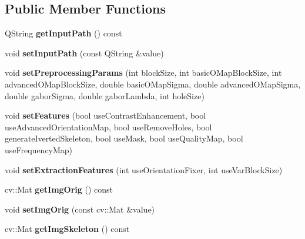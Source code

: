 \subsection*{Public Member Functions}
\begin{DoxyCompactItemize}
\item 
\mbox{\label{class_extraction_tester_a08e0e44aa7b635877e8254fef2a9f7d4}} 
Q\+String {\bfseries get\+Input\+Path} () const
\item 
\mbox{\label{class_extraction_tester_ab1d54e456d20bc1d921cfa6e0491c06c}} 
void {\bfseries set\+Input\+Path} (const Q\+String \&value)
\item 
\mbox{\label{class_extraction_tester_a19d6aa346489851a1b0812518f98de44}} 
void {\bfseries set\+Preprocessing\+Params} (int block\+Size, int basic\+O\+Map\+Block\+Size, int advanced\+O\+Map\+Block\+Size, double basic\+O\+Map\+Sigma, double advanced\+O\+Map\+Sigma, double gabor\+Sigma, double gabor\+Lambda, int hole\+Size)
\item 
\mbox{\label{class_extraction_tester_a0bd042b9f638d158c8c6de3d7f24ee10}} 
void {\bfseries set\+Features} (bool use\+Contrast\+Enhancement, bool use\+Advanced\+Orientation\+Map, bool use\+Remove\+Holes, bool generate\+Iverted\+Skeleton, bool use\+Mask, bool use\+Quality\+Map, bool use\+Frequency\+Map)
\item 
\mbox{\label{class_extraction_tester_a5cfce171a89497befe38148cf7a10792}} 
void {\bfseries set\+Extraction\+Features} (int use\+Orientation\+Fixer, int use\+Var\+Block\+Size)
\item 
\mbox{\label{class_extraction_tester_a88092baa79b5fec778000f0b52128fc4}} 
cv\+::\+Mat {\bfseries get\+Img\+Orig} () const
\item 
\mbox{\label{class_extraction_tester_af48075cb87a5c99d3e5b9e9f756da1e3}} 
void {\bfseries set\+Img\+Orig} (const cv\+::\+Mat \&value)
\item 
\mbox{\label{class_extraction_tester_a74c9c9a022b90d5f781c719dd34c5f99}} 
cv\+::\+Mat {\bfseries get\+Img\+Skeleton} () const

\end{DoxyCompactItemize}
